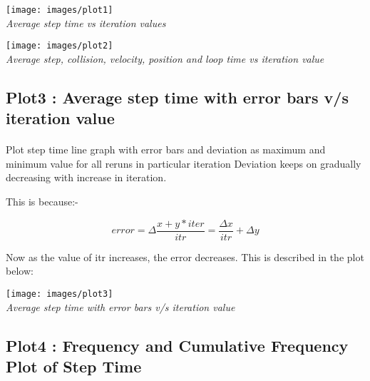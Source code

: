 \documentclass[11pt]{article}
\begin{document}
\begin{center}
 \texttt{[image: images/plot1]} \\
  \emph{Average step time vs iteration values} \\
\end{center}

\begin{center}
 \texttt{[image: images/plot2]} \\
  \emph{Average step, collision, velocity, position and loop time vs iteration value} \\
\end{center}


\subsection{Plot3 : Average step time with error bars v/s iteration value}
\paragraph{}
Plot step time line graph with error bars and deviation as maximum and minimum value for all reruns in particular iteration
Deviation keeps on gradually decreasing with increase in iteration.

This is because:-

\begin{equation}
	error = \Delta \frac {x+y*iter} {itr} = \frac {\Delta{x}} {itr} + \Delta{y}
\end{equation}

Now as the value of itr increases, the error decreases. This is described in the plot below:
\begin{center}
 \texttt{[image: images/plot3]} \\
  \emph{Average step time with error bars v/s iteration value} \\
\end{center}


\subsection{Plot4 : Frequency and Cumulative Frequency Plot of Step Time}
\paragraph{}
\end{document}
